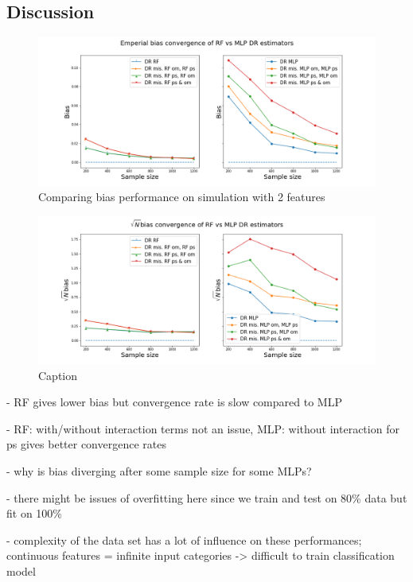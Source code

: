 \documentclass[12pt,twoside]{article}
\begin{document}
\subsection{Discussion}
\begin{figure}[h!]
    \centering
    \includegraphics[width = 0.9\columnwidth]{figures/biascompare.png}
    \caption{Comparing bias performance on simulation with 2 features}
    \label{fig:my_label}
\end{figure}

\begin{figure}[h!]
    \centering
    \includegraphics[width = 0.9\columnwidth]{figures/sqrtncompare.png}
    \caption{Caption}
    \label{fig:my_label}
\end{figure}


- RF gives lower bias but convergence rate is slow compared to MLP 

- RF: with/without interaction terms not an issue, MLP: without interaction for ps gives better convergence rates 

- why is bias diverging after some sample size for some MLPs?

- there might be issues of overfitting here since we train and test on 80\% data but fit on 100\%

- complexity of the data set has a lot of influence on these performances; continuous features = infinite input categories -> difficult to train classification model 
\end{document}

